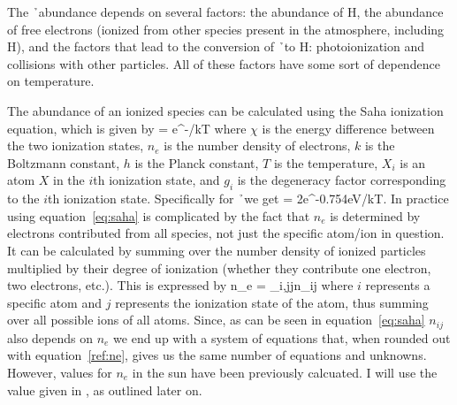 The \h\ abundance depends on several factors: the abundance of H, the
abundance of free electrons (ionized from other species present in the
atmosphere, including H), and the factors that lead to the conversion
of \h\ to H: photoionization and collisions with other particles.  All
of these factors have some sort of dependence on temperature.



The abundance of an ionized species can be calculated using the Saha
ionization equation, which is given by
\beq
\label{eq:saha}
 = e^{-\chi/kT}
\eeq
 where $\chi$ is the energy difference between the two ionization
states, $n_e$ is the number density of electrons, $k$ is the Boltzmann
constant, $h$ is the Planck constant, $T$ is the temperature, $X_i$ is
an atom $X$ in the $i$th ionization state, and $g_i$ is the degeneracy
factor corresponding to the $i$th ionization state.  Specifically
for \h\ we get
\beq
\label{eq:thisone}
 = 2e^{-0.754\textrm{eV}/kT}.
\eeq
In practice using equation~\ref{eq:saha} is complicated by the fact that
$n_e$ is determined by electrons contributed from all species, not
just the specific atom/ion in question.  It can be calculated by
summing over the number density
of ionized particles multiplied by their degree of ionization (whether
they contribute one electron, two electrons, etc.). This is expressed by
\beq
\label{ref:ne}
n_e = \sum\limits_{i,j}j\times n_{ij}
\eeq
where $i$ represents a specific atom and $j$ represents the ionization state
of the atom, thus summing over all possible ions of all atoms.  Since,
as can be seen in equation~\ref{eq:saha} $n_{ij}$ also depends on
$n_e$ we end up with a system of equations that, when rounded out with
equation~\ref{ref:ne}, gives us the same number of equations and
unknowns.  However, values for $n_e$ in the sun have been previously
calcuated. I will use the value given in \cite{boehm1989}, as
outlined later on.  


